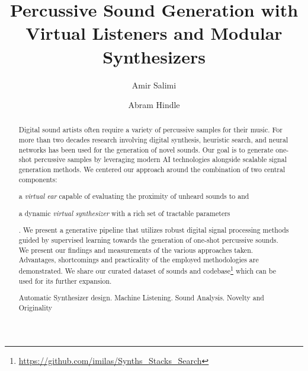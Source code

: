 \documentclass[runningheads,a4paper]{llncs}
\newcommand{\keywords}[1]{\par\addvspace\baselineskip
\noindent\keywordname\enspace\ignorespaces#1}
\begin{document}
\mainmatter  %

\title{Percussive Sound Generation with Virtual Listeners and Modular Synthesizers}


%
%
\author{Amir Salimi \and Abram Hindle}
%


%
%

\maketitle

\begin{abstract}
Digital sound artists often require a variety of percussive samples for their music. For more than two decades research involving digital synthesis, heuristic search, and neural networks has been used for the generation of novel sounds. Our goal is to generate one-shot percussive samples by leveraging modern AI technologies alongside scalable signal generation methods. We centered our approach around the combination of two central components: \begin {enumerate*} [label=(\roman*)] \item a \emph{virtual ear} capable of evaluating the proximity of unheard sounds to  and \item a dynamic \emph{virtual synthesizer} with a rich set of tractable parameters\end{enumerate*}. We present a generative pipeline that utilizes robust digital signal processing methods guided by supervised learning towards the generation of one-shot percussive sounds. We present our findings and measurements of the various approaches taken. Advantages, shortcomings and practicality of the employed methodologies are demonstrated. We share our curated dataset of sounds and codebase\footnote{\url{https://github.com/imilas/Synths_Stacks_Search}} which can be used for its further expansion.
\keywords{Automatic Synthesizer design. Machine Listening. Sound Analysis. Novelty and Originality}
\end{abstract}
\end{document}
